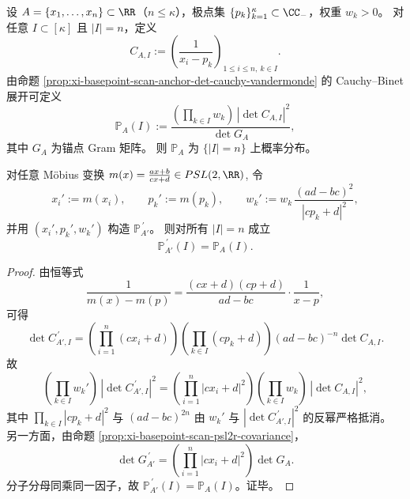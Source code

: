 \begin{theorem}\label{thm:xi-anchor-subset-holographic-distribution-psl-invariant}
设 \(A=\{x_1,\dots,x_n\}\subset\RR\)（\(n\le \kappa\)），极点集 \(\{p_k\}_{k=1}^{\kappa}\subset\CC_-\)，权重 \(w_k>0\)。
对任意 \(I\subset[\kappa]\) 且 \(|I|=n\)，定义
\[
C_{A,I}:=\left(\frac{1}{x_i-p_k}\right)_{1\le i\le n,\ k\in I}.
\]
由命题 \ref{prop:xi-basepoint-scan-anchor-det-cauchy-vandermonde} 的 Cauchy--Binet 展开可定义
\[
\mathbb P_A(I):=
\frac{\left(\prod_{k\in I}w_k\right)\,|\det C_{A,I}|^2}{\det G_A},
\]
其中 \(G_A\) 为锚点 Gram 矩阵。
则 \(\mathbb P_A\) 为 \(\{|I|=n\}\) 上概率分布。
\par
对任意 Möbius 变换
\(
m(x)=\frac{ax+b}{cx+d}\in PSL(2,\RR)
\),
令
\[
x_i':=m(x_i),\qquad p_k':=m(p_k),\qquad
w_k':=w_k\,\frac{(ad-bc)^2}{|cp_k+d|^2},
\]
并用 \((x_i',p_k',w_k')\) 构造 \(\mathbb P_{A'}^{\,\prime}\)。
则对所有 \(|I|=n\) 成立
\[
\mathbb P_{A'}^{\,\prime}(I)=\mathbb P_A(I).
\]
\end{theorem}
\begin{proof}
由恒等式
\[
\frac{1}{m(x)-m(p)}
=
\frac{(cx+d)(cp+d)}{ad-bc}\cdot\frac{1}{x-p},
\]
可得
\[
\det C_{A',I}^{\,\prime}
=
\left(\prod_{i=1}^{n}(cx_i+d)\right)
\left(\prod_{k\in I}(cp_k+d)\right)
(ad-bc)^{-n}\det C_{A,I}.
\]
故
\[
\left(\prod_{k\in I}w_k'\right)\,|\det C_{A',I}^{\,\prime}|^2
=
\left(\prod_{i=1}^{n}|cx_i+d|^2\right)
\left(\prod_{k\in I}w_k\right)\,|\det C_{A,I}|^2,
\]
其中 \(\prod_{k\in I}|cp_k+d|^2\) 与 \((ad-bc)^{2n}\) 由 \(w_k'\) 与 \(|\det C_{A',I}^{\,\prime}|^2\) 的反幂严格抵消。
另一方面，由命题 \ref{prop:xi-basepoint-scan-psl2r-covariance}，
\[
\det G_{A'}^{\,\prime}
=
\left(\prod_{i=1}^{n}|cx_i+d|^2\right)\det G_A.
\]
分子分母同乘同一因子，故 \(\mathbb P_{A'}^{\,\prime}(I)=\mathbb P_A(I)\)。证毕。
\end{proof}

